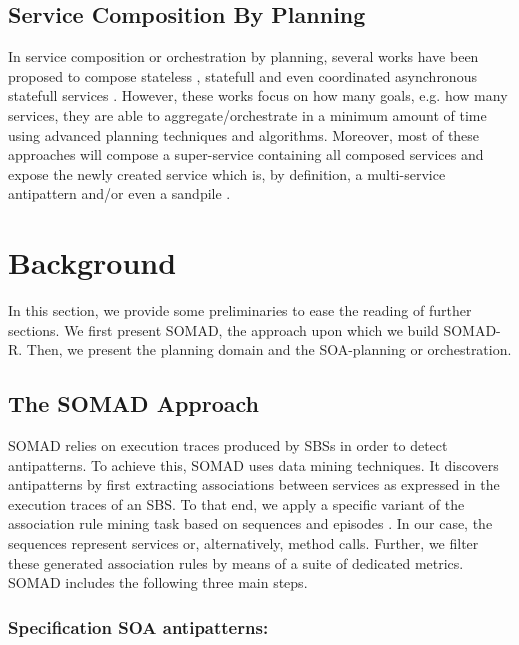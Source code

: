\documentclass[lnbip]{svmultln}
\begin{document}
\subsection{Service Composition By Planning}

In service composition or orchestration by planning, several works have been proposed to compose stateless \cite{narayanan2002simulation}, statefull \cite{berardi2005composition, marconi2006specifying} and even coordinated asynchronous statefull services \cite{pistore2005automated, bertoli2009continuous}.  However, these works focus on how many goals, e.g. how many services, they are able to aggregate/orchestrate in a minimum amount of time using advanced planning techniques and algorithms. Moreover, most of these approaches will compose a super-service containing all composed services and expose the newly created service which is, by definition, a multi-service antipattern and/or even a sandpile \cite{Palma}.


\section{Background}

In this section, we provide some preliminaries to ease the reading of further sections. We first present SOMAD, the approach upon which we build SOMAD-R. Then, we present the planning domain and the SOA-planning or orchestration. 


\subsection{The SOMAD Approach\label{somad}}

SOMAD relies on execution traces produced by SBSs in order to detect antipatterns. To achieve this, SOMAD uses data mining techniques. It discovers antipatterns by first extracting associations between services as expressed in the execution traces of an SBS. To that end, we apply a specific variant of the association rule mining task based on sequences and episodes \cite{Mannila1997}. In our case, the sequences represent services or, alternatively, method calls. Further, we filter these generated association rules by means of a suite of dedicated metrics. SOMAD includes the following three main steps.

\subsubsection{Specification SOA antipatterns:}
\end{document}
